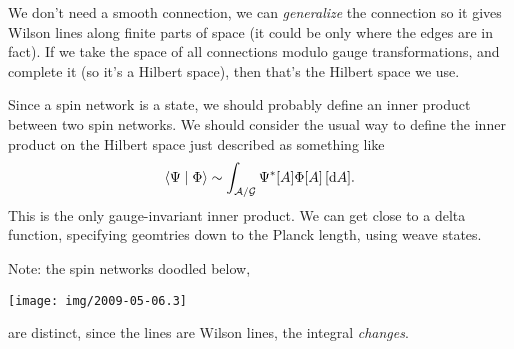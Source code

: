 We don't need a smooth connection, we can \emph{generalize} the
connection so it gives Wilson lines along finite parts of space (it
could be only where the edges are in fact). If we take the space of all
connections modulo gauge transformations, and complete it (so it's a
Hilbert space), then that's the Hilbert space we use.

Since a spin network is a state, we should probably define an inner
product between two spin networks. We should consider the usual way to
define the inner product on the Hilbert space just described as
something like
\begin{equation}
\langle\Psi\mid\Phi\rangle\sim\int_{\mathcal{A}/\mathcal{G}}\Psi^{*}[A]\Phi[A]\,[\mathrm{d} A].
\end{equation}
This is the only gauge-invariant inner product. We can get close to a
delta function, specifying geomtries down to the Planck length, using
weave states.

\bigbreak
Note: the spin networks doodled below,
\begin{center}
  \texttt{[image: img/2009-05-06.3]}
\end{center}
are distinct, since the lines are Wilson lines, the integral \emph{changes}.
